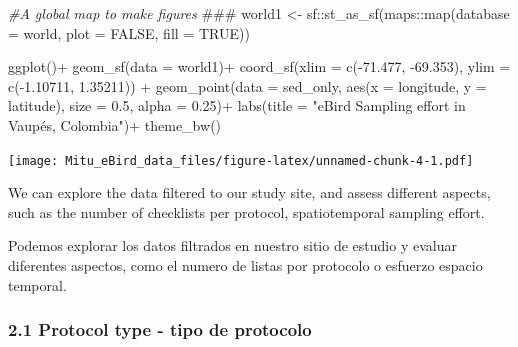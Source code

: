 \documentclass[
]{article}
\newenvironment{Shaded}{\begin{snugshade}}{\end{snugshade}}
\newcommand{\AlertTok}[1]{\textcolor[rgb]{0.94,0.16,0.16}{#1}}
\newcommand{\AttributeTok}[1]{\textcolor[rgb]{0.77,0.63,0.00}{#1}}
\newcommand{\CommentTok}[1]{\textcolor[rgb]{0.56,0.35,0.01}{\textit{#1}}}
\newcommand{\ConstantTok}[1]{\textcolor[rgb]{0.00,0.00,0.00}{#1}}
\newcommand{\FloatTok}[1]{\textcolor[rgb]{0.00,0.00,0.81}{#1}}
\newcommand{\FunctionTok}[1]{\textcolor[rgb]{0.00,0.00,0.00}{#1}}
\newcommand{\NormalTok}[1]{#1}
\newcommand{\OtherTok}[1]{\textcolor[rgb]{0.56,0.35,0.01}{#1}}
\newcommand{\SpecialCharTok}[1]{\textcolor[rgb]{0.00,0.00,0.00}{#1}}
\newcommand{\StringTok}[1]{\textcolor[rgb]{0.31,0.60,0.02}{#1}}
\begin{document}
\begin{Shaded}
\begin{Highlighting}[]
\CommentTok{\#A global map to make figures }\AlertTok{\#\#\#}
\NormalTok{world1 }\OtherTok{\textless{}{-}}\NormalTok{ sf}\SpecialCharTok{::}\FunctionTok{st\_as\_sf}\NormalTok{(maps}\SpecialCharTok{::}\FunctionTok{map}\NormalTok{(}\AttributeTok{database =} \StringTok{\textquotesingle{}world\textquotesingle{}}\NormalTok{, }\AttributeTok{plot =} \ConstantTok{FALSE}\NormalTok{, }\AttributeTok{fill =} \ConstantTok{TRUE}\NormalTok{))}

\FunctionTok{ggplot}\NormalTok{()}\SpecialCharTok{+}
  \FunctionTok{geom\_sf}\NormalTok{(}\AttributeTok{data =}\NormalTok{ world1)}\SpecialCharTok{+}
  \FunctionTok{coord\_sf}\NormalTok{(}\AttributeTok{xlim =} \FunctionTok{c}\NormalTok{(}\SpecialCharTok{{-}}\FloatTok{71.477}\NormalTok{, }\SpecialCharTok{{-}}\FloatTok{69.353}\NormalTok{), }
           \AttributeTok{ylim =}  \FunctionTok{c}\NormalTok{(}\SpecialCharTok{{-}}\FloatTok{1.10711}\NormalTok{, }\FloatTok{1.35211}\NormalTok{)) }\SpecialCharTok{+}
  \FunctionTok{geom\_point}\NormalTok{(}\AttributeTok{data =}\NormalTok{ sed\_only, }
             \FunctionTok{aes}\NormalTok{(}\AttributeTok{x =}\NormalTok{ longitude, }\AttributeTok{y =}\NormalTok{ latitude), }
             \AttributeTok{size =} \FloatTok{0.5}\NormalTok{, }
             \AttributeTok{alpha =} \FloatTok{0.25}\NormalTok{)}\SpecialCharTok{+}
  \FunctionTok{labs}\NormalTok{(}\AttributeTok{title =} \StringTok{"eBird Sampling effort in Vaupés, Colombia"}\NormalTok{)}\SpecialCharTok{+}
  \FunctionTok{theme\_bw}\NormalTok{()}
\end{Highlighting}
\end{Shaded}

\texttt{[image: Mitu\_eBird\_data\_files/figure-latex/unnamed-chunk-4-1.pdf]}

We can explore the data filtered to our study site, and assess different
aspects, such as the number of checklists per protocol, spatiotemporal
sampling effort.

Podemos explorar los datos filtrados en nuestro sitio de estudio y
evaluar diferentes aspectos, como el numero de listas por protocolo o
esfuerzo espacio temporal.

\hypertarget{protocol-type---tipo-de-protocolo}{%
\subsubsection{2.1 Protocol type - tipo de
protocolo}\label{protocol-type---tipo-de-protocolo}}
\end{document}
